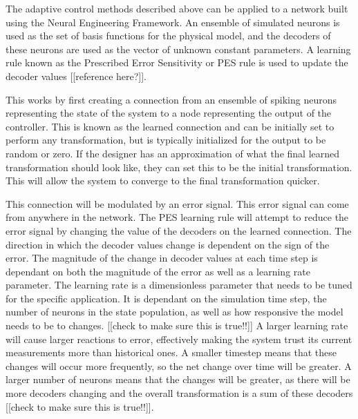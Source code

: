 \documentclass[letterpaper,12pt,titlepage,oneside,final]{book}
\begin{document}

The adaptive control methods described above can be applied to a network built using the Neural Engineering Framework. 
An ensemble of simulated neurons is used as the set of basis functions for the physical model, and the decoders of these neurons are used as the vector of unknown constant parameters. 
A learning rule known as the Prescribed Error Sensitivity or PES rule is used to update the decoder values [[reference here?]]. 

This works by first creating a connection from an ensemble of spiking neurons representing the state of the system to a node representing the output of the controller. 
This is known as the learned connection and can be initially set to perform any transformation, but is typically initialized for the output to be random or zero. 
If the designer has an approximation of what the final learned transformation should look like, they can set this to be the initial transformation. 
This will allow the system to converge to the final transformation quicker.

This connection will be modulated by an error signal. 
This error signal can come from anywhere in the network. 
The PES learning rule will attempt to reduce the error signal by changing the value of the decoders on the learned connection. 
The direction in which the decoder values change is dependent on the sign of the error. 
The magnitude of the change in decoder values at each time step is dependant on both the magnitude of the error as well as a learning rate parameter. 
The learning rate is a dimensionless parameter that needs to be tuned for the specific application. 
It is dependant on the simulation time step, the number of neurons in the state population, as well as how responsive the model needs to be to changes. [[check to make sure this is true!!]] 
A larger learning rate will cause larger reactions to error, effectively making the system trust its current measurements more than historical ones. 
A smaller timestep means that these changes will occur more frequently, so the net change over time will be greater. 
A larger number of neurons means that the changes will be greater, as there will be more decoders changing and the overall transformation is a sum of these decoders [[check to make sure this is true!!]].
\end{document}
